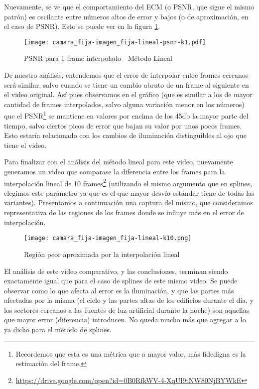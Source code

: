\par Nuevamente, se ve que el comportamiento del ECM (o PSNR, que sigue el
mismo patr\'on) es oscilante entre n\'umeros altos de error y bajos (o de
aproximaci\'on, en el caso de PSNR). Esto se puede ver en la figura
\ref{fig:fija-fija_lineal-psnr-k1}.

\begin{figure}
    \centering
    \texttt{[image: camara\_fija-imagen\_fija-lineal-psnr-k1.pdf]}
    \caption{PSNR para 1 frame interpolado - M\'etodo Lineal}
    \label{fig:fija-fija_lineal-psnr-k1}
\end{figure}

\par De nuestro an\'alisis, entendemos que el error de interpolar entre frames
cercanos ser\'a similar, salvo cuando se tiene un cambio abruto de un frame al
siguiente en el video original. As\'i pues observamos en el gr\'afico (que es
similar a los de mayor cantidad de frames interpolados, salvo alguna
variaci\'on menor en los n\'umeros) que el PSNR\footnote{Recordemos que esta es
una m\'etrica que a mayor valor, m\'as fidedigna es la estimaci\'on del frame.}
se mantiene en valores por encima de los 45db la mayor parte del tiempo, salvo
ciertos picos de error que bajan su valor por unos pocos frames. Esto estar\'ia
relacionado con los cambios de iluminaci\'on distinguibles al ojo que tiene el
video.

\par Para finalizar con el an\'alisis del m\'etodo lineal para este video,
nuevamente generamos un video que comparase la diferencia entre los frames para
la interpolaci\'on lineal de 10
frames\footnote{\url{https://drive.google.com/open?id=0B0RfkWV-4-XqUl9tNW80NjBYWkE}}
(utilizando el mismo argumento que en splines, elegimos este par\'ametro ya que
es el que mayor desv\'io est\'andar tiene de todas las variantes). Presentamos
a continuaci\'on una captura del mismo, que consideramos representativa de las
regiones de los frames donde se influye m\'as en el error de interpolaci\'on.

\begin{figure}[H]
    \centering
    \texttt{[image: camara\_fija-imagen\_fija-lineal-k10.png]}
    \label{fig:fija-fija_lineal-heatmap}
    \caption{Regi\'on peor aproximada por la interpolaci\'on lineal}
\end{figure}

\par El an\'alisis de este video comparativo, y las conclusiones, terminan
siendo exactamente igual que para el caso de splines de este mismo video. Se
puede observar como lo que afecta al error es la iluminaci\'on, y que las
partes m\'as afectadas por la misma (el cielo y las partes altas de los
edificios durante el d\'ia, y los sectores cercanos a las fuentes de luz
artificial durante la noche) son aquellas que mayor error (diferencia)
introducen. No queda mucho m\'as que agregar a lo ya dicho para el m\'etodo de
splines.

